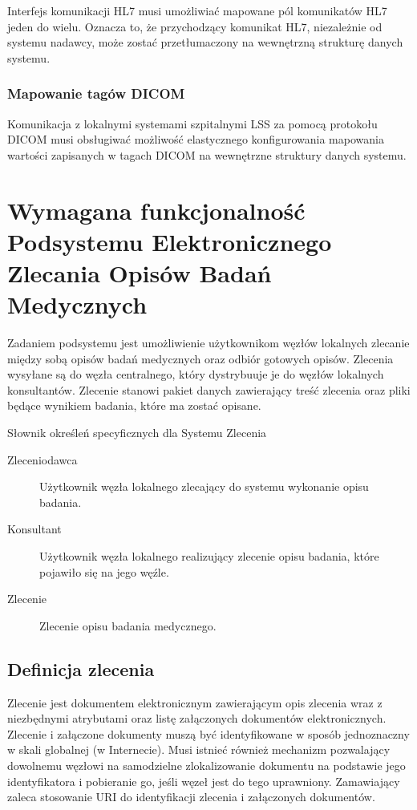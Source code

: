 \documentclass[a4paper]{report}
\begin{document}
Interfejs komunikacji HL7 musi umożliwiać mapowane pól komunikatów HL7 jeden do wielu. Oznacza to, że przychodzący komunikat HL7, niezależnie od systemu nadawcy, może zostać przetłumaczony na wewnętrzną strukturę danych systemu.

\subsection{Mapowanie tagów DICOM}

Komunikacja z lokalnymi systemami szpitalnymi LSS za pomocą protokołu DICOM musi obsługiwać możliwość elastycznego konfigurowania mapowania wartości zapisanych w tagach DICOM na wewnętrzne struktury danych systemu.

\chapter[Podsystem Elektronicznego Zlecania Opisów Badań]{Wymagana funkcjonalność Podsystemu Elektronicznego Zlecania Opisów Badań Medycznych}

Zadaniem podsystemu jest umożliwienie użytkownikom węzłów lokalnych zlecanie między sobą opisów
badań medycznych oraz odbiór gotowych opisów. Zlecenia wysyłane są do węzła centralnego, który
dystrybuuje je do węzłów lokalnych konsultantów. Zlecenie stanowi pakiet danych zawierający
treść zlecenia oraz pliki będące wynikiem badania, które ma zostać opisane. 

Słownik określeń specyficznych dla Systemu Zlecenia
\begin{description}
  \item[Zleceniodawca] Użytkownik węzła lokalnego zlecający do systemu wykonanie opisu badania.
  \item[Konsultant] Użytkownik węzła lokalnego realizujący zlecenie opisu badania, które pojawiło się na jego węźle.
  \item[Zlecenie] Zlecenie opisu badania medycznego.
\end{description}

\section{Definicja zlecenia}

Zlecenie jest dokumentem elektronicznym zawierającym opis zlecenia wraz z niezbędnymi atrybutami oraz listę załączonych dokumentów elektronicznych. Zlecenie i załączone dokumenty muszą być identyfikowane w sposób jednoznaczny w skali globalnej (w Internecie). Musi istnieć również mechanizm pozwalający dowolnemu węzłowi na samodzielne zlokalizowanie dokumentu na podstawie jego identyfikatora i pobieranie go, jeśli węzeł jest do tego uprawniony. Zamawiający zaleca stosowanie URI do identyfikacji zlecenia i załączonych dokumentów.
\end{document}
